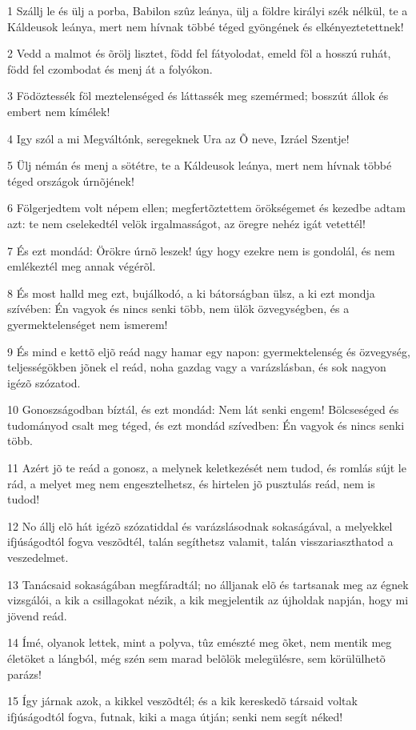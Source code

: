\par 1 Szállj le és ülj a porba, Babilon szûz leánya, ülj a földre királyi szék nélkül, te a Káldeusok leánya, mert nem hívnak többé téged gyöngének és elkényeztetettnek!
\par 2 Vedd a malmot és õrölj lisztet, född fel fátyolodat, emeld föl a hosszú ruhát, född fel czombodat és menj át a folyókon.
\par 3 Födöztessék föl meztelenséged és láttassék meg szemérmed; bosszút állok és embert nem kímélek!
\par 4 Igy szól a mi Megváltónk, seregeknek Ura az Õ neve, Izráel Szentje!
\par 5 Ülj némán és menj a sötétre, te a Káldeusok leánya, mert nem hívnak többé téged országok úrnõjének!
\par 6 Fölgerjedtem volt népem ellen; megfertõztettem örökségemet és kezedbe adtam azt: te nem cselekedtél velök irgalmasságot, az öregre nehéz igát vetettél!
\par 7 És ezt mondád: Örökre úrnõ leszek! úgy hogy ezekre nem is gondolál, és nem emlékeztél meg annak végérõl.
\par 8 És most halld meg ezt, bujálkodó, a ki bátorságban ülsz, a ki ezt mondja szívében: Én vagyok és nincs senki több, nem ülök özvegységben, és a gyermektelenséget nem ismerem!
\par 9 És mind e kettõ eljõ reád nagy hamar egy napon: gyermektelenség és özvegység, teljességökben jõnek el reád, noha gazdag vagy a varázslásban, és sok nagyon igézõ szózatod.
\par 10 Gonoszságodban bíztál, és ezt mondád: Nem lát senki engem! Bölcseséged és tudományod csalt meg téged, és ezt mondád szívedben: Én vagyok és nincs senki több.
\par 11 Azért jõ te reád a gonosz, a melynek keletkezését nem tudod, és romlás sújt le rád, a melyet meg nem engesztelhetsz, és hirtelen jõ pusztulás reád, nem is tudod!
\par 12 No állj elõ hát igézõ szózatiddal és varázslásodnak sokaságával, a melyekkel ifjúságodtól fogva veszõdtél, talán segíthetsz valamit, talán visszariaszthatod a veszedelmet.
\par 13 Tanácsaid sokaságában megfáradtál; no álljanak elõ és tartsanak meg az égnek vizsgálói, a kik a csillagokat nézik, a kik megjelentik az újholdak napján, hogy mi jövend reád.
\par 14 Ímé, olyanok lettek, mint a polyva, tûz emészté meg õket, nem mentik meg életöket a lángból, még szén sem marad belõlök melegülésre, sem körülülhetõ parázs!
\par 15 Így járnak azok, a kikkel veszõdtél; és a kik kereskedõ társaid voltak ifjúságodtól fogva, futnak, kiki a maga útján; senki nem segít néked!

